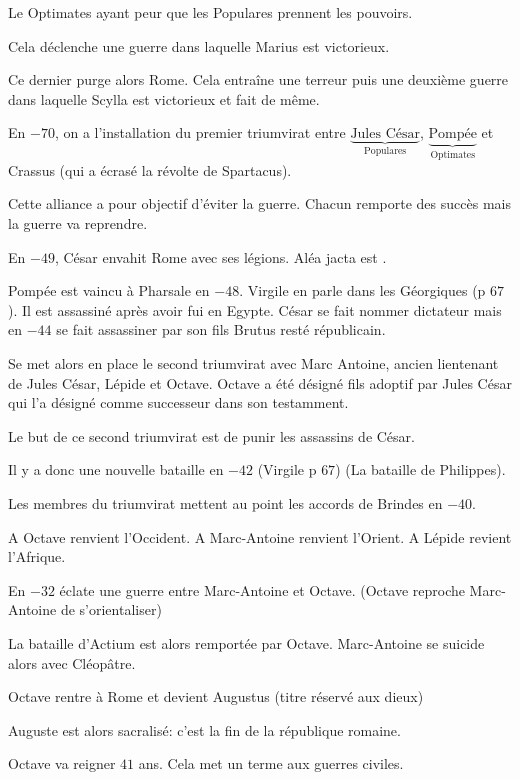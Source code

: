 \documentclass[a4paper, 11pt, hidelinks]{article}
\begin{document}
Le Optimates ayant peur que les Populares prennent les pouvoirs.

Cela déclenche une guerre dans laquelle Marius est victorieux.

Ce dernier purge alors Rome. Cela entraîne une terreur puis une deuxième guerre dans laquelle Scylla est victorieux et fait de même.


En $-70$, on a l'installation du premier \og triumvirat \fg entre $\underbrace{\text{Jules César}}_{\text{Populares}}$, 
$\underbrace{\text{Pompée}}_{\text{Optimates}}$ et Crassus (qui a écrasé la révolte de Spartacus).


Cette alliance a pour objectif d'éviter la guerre. Chacun remporte des succès mais la guerre va reprendre.


En $-49$, César envahit Rome avec ses légions. \og Aléa jacta est \fg.


Pompée est vaincu à Pharsale en $-48$. Virgile en parle dans les Géorgiques (p $67$). Il est assassiné après avoir fui en Egypte.
César se fait nommer dictateur mais en $-44$ se fait assassiner par son fils Brutus resté républicain.


Se met alors en place le second \og triumvirat \fg avec Marc Antoine, ancien lientenant de Jules César, Lépide et Octave.
Octave a été désigné fils adoptif par Jules César qui l'a désigné comme successeur dans son testamment.


Le but de ce second triumvirat est de punir les assassins de César.


Il y a donc une nouvelle bataille en $-42$ (Virgile p $67$) (La bataille de Philippes).


Les membres du triumvirat mettent au point les accords de Brindes en $-40$. 


A Octave renvient l'Occident. A Marc-Antoine renvient l'Orient. A Lépide revient l'Afrique.


En $-32$ éclate une guerre entre Marc-Antoine et Octave. (Octave reproche Marc-Antoine de s'orientaliser)


La bataille d'Actium est alors remportée par Octave. Marc-Antoine se suicide alors avec Cléopâtre.


Octave rentre à Rome et devient \og Augustus \fg (titre réservé aux dieux)


Auguste est alors sacralisé: c'est la fin de la république romaine.


Octave va reigner $41$ ans. Cela met un terme aux guerres civiles.
\end{document}
